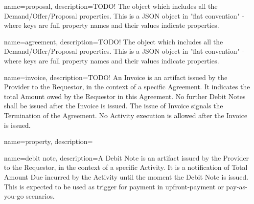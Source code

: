 {
        name=proposal,
        description={TODO! The object which includes all the Demand/Offer/Proposal properties. 
					This is a JSON object in "flat convention" - where keys are full property names and 
					their values indicate properties.}
}

{
        name=agreement,
        description={TODO! The object which includes all the Demand/Offer/Proposal properties. 
					This is a JSON object in "flat convention" - where keys are full property names and 
					their values indicate properties.}
}

{
        name=invoice,
        description={TODO! An Invoice is an artifact issued by the Provider to the Requestor, 
					in the context of a specific Agreement. It indicates the total Amount owed by 
					the Requestor in this Agreement. 
					No further Debit Notes shall be issued after the Invoice is issued. 
					The issue of Invoice signals the Termination of the Agreement. 
					No Activity execution is allowed after the Invoice is issued.}
}

{
        name=property,
        description={}
}

{
        name=debit note,
        description={A Debit Note is an artifact issued by the Provider to the Requestor, in the context of a specific Activity. 
					It is a notification of Total Amount Due incurred by the Activity until the moment the Debit Note is issued. 
					This is expected to be used as trigger for payment in upfront-payment or pay-as-you-go scenarios.}
}

